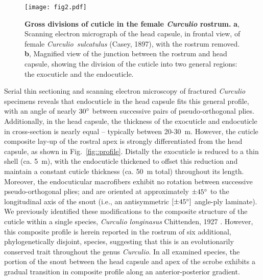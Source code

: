 \documentclass[twocolumn, linenumbers, superscriptaddress, nofootinbib]{revtex4-1}
\begin{document}
		\begin{figure}
			\centering
			\texttt{[image: fig2.pdf]}
			\caption{\textbf{Gross divisions of cuticle in the female \textit{Curculio} rostrum.}
				\textbf{a}, Scanning electron micrograph of the head capsule, in frontal view, of female \textit{Curculio~sulcatulus} (Casey, 1897), with the rostrum removed.
				\textbf{b}, Magnified view of the junction between the rostrum and head capsule, showing the division of the cuticle into two general regions: the exocuticle and the endocuticle.
			}
			\label{fig::cuticle}
		\end{figure}
		
		Serial thin sectioning and scanning electron microscopy of fractured \textit{Curculio} specimens reveals that endocuticle in the head capsule fits this general profile, with an angle of nearly $30\degree$ between successive pairs of pseudo-orthogonal plies.
		Additionally, in the head capsule, the thickness of the exocuticle and endocuticle in cross-section is nearly equal -- typically between 20-30 \,{\textmu}m.
		However, the cuticle composite lay-up of the rostral apex is strongly differentiated from the head capsule, as shown in Fig.~\ref{fig::profile}.
		Distally the exocuticle is reduced to a thin shell (ca. 5 \,{\textmu}m), with the endocuticle thickened to offset this reduction and maintain a constant cuticle thickness (ca. 50 \,{\textmu}m total) throughout its length.
		Moreover, the endocuticular macrofibers exhibit no rotation between successive pseudo-orthogonal plies; and are oriented at approximately $\pm45\degree$ to the longitudinal axis of the snout (i.e., an antisymmetric $[\pm45\degree]$ angle-ply laminate).
		We previously identified these modifications to the composite structure of the cuticle within a single species, \textit{Curculio longinasus} Chittenden, 1927 \cite{Jansen2016, Singh2016}.
		However, this composite profile is herein reported in the rostrum of six additional, phylogenetically disjoint, species, suggesting that this is an evolutionarily conserved trait throughout the genus \textit{Curculio}.
		In all examined species, the portion of the snout between the head capsule and apex of the scrobe exhibits a gradual transition in composite profile along an anterior-posterior gradient.
		
\end{document}
